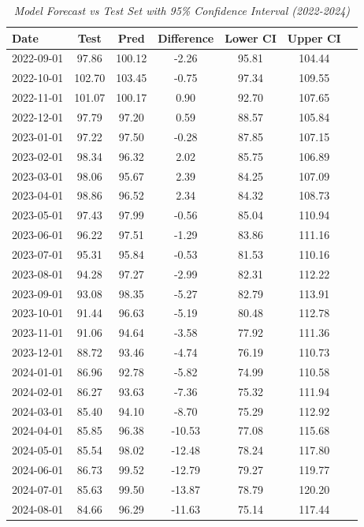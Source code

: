 \documentclass[11pt]{article}
\begin{document}
\begin{table}[H]
    \caption*{\textit{Model Forecast vs Test Set  with 95\% Confidence Interval (2022-2024)}}
    \centering
    \begin{tabular}{lcccccc}
        \toprule
        Date & Test & Pred & Difference & Lower CI & Upper CI \\
        \midrule
        2022-09-01 & 97.86 & 100.12 & -2.26 & 95.81 & 104.44 \\
        2022-10-01 & 102.70 & 103.45 & -0.75 & 97.34 & 109.55 \\
        2022-11-01 & 101.07 & 100.17 & 0.90 & 92.70 & 107.65 \\
        2022-12-01 & 97.79 & 97.20 & 0.59 & 88.57 & 105.84 \\
        2023-01-01 & 97.22 & 97.50 & -0.28 & 87.85 & 107.15 \\
        2023-02-01 & 98.34 & 96.32 & 2.02 & 85.75 & 106.89 \\
        2023-03-01 & 98.06 & 95.67 & 2.39 & 84.25 & 107.09 \\
        2023-04-01 & 98.86 & 96.52 & 2.34 & 84.32 & 108.73 \\
        2023-05-01 & 97.43 & 97.99 & -0.56 & 85.04 & 110.94 \\
        2023-06-01 & 96.22 & 97.51 & -1.29 & 83.86 & 111.16 \\
        2023-07-01 & 95.31 & 95.84 & -0.53 & 81.53 & 110.16 \\
        2023-08-01 & 94.28 & 97.27 & -2.99 & 82.31 & 112.22 \\
        2023-09-01 & 93.08 & 98.35 & -5.27 & 82.79 & 113.91 \\
        2023-10-01 & 91.44 & 96.63 & -5.19 & 80.48 & 112.78 \\
        2023-11-01 & 91.06 & 94.64 & -3.58 & 77.92 & 111.36 \\
        2023-12-01 & 88.72 & 93.46 & -4.74 & 76.19 & 110.73 \\
        2024-01-01 & 86.96 & 92.78 & -5.82 & 74.99 & 110.58 \\
        2024-02-01 & 86.27 & 93.63 & -7.36 & 75.32 & 111.94 \\
        2024-03-01 & 85.40 & 94.10 & -8.70 & 75.29 & 112.92 \\
        2024-04-01 & 85.85 & 96.38 & -10.53 & 77.08 & 115.68 \\
        2024-05-01 & 85.54 & 98.02 & -12.48 & 78.24 & 117.80 \\
        2024-06-01 & 86.73 & 99.52 & -12.79 & 79.27 & 119.77 \\
        2024-07-01 & 85.63 & 99.50 & -13.87 & 78.79 & 120.20 \\
        2024-08-01 & 84.66 & 96.29 & -11.63 & 75.14 & 117.44 \\
        \bottomrule
    \end{tabular}
\end{table}
\end{document}
